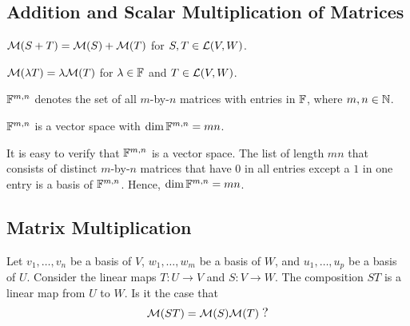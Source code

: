 \subsection{Addition and Scalar Multiplication of Matrices}

\setcounter{thm}{34}
\begin{thm}
  \label{thm: matrix of the sum of linear maps}
  $\mathcal{M}(S+T) = \mathcal{M}(S) + \mathcal{M}(T)$ for $S, T \in \mathcal{L} (V,W)$.
\end{thm}

\setcounter{thm}{37}
\begin{thm}
  \label{thm: matrix of a scalar times a linear map}
  $\mathcal{M}(\lambda T) = \lambda \mathcal{M}(T)$ for $\lambda \in \mathbb{F}$ and $T \in \mathcal{L} (V,W)$.
\end{thm}

\begin{mydef} 
  $\mathbb{F}^{m,n}$ denotes the set of all $m$-by-$n$ matrices with entries in $\mathbb{F}$, where $m,n \in \mathbb{N}$.
\end{mydef}

\begin{thm} 
  \label{thm: the dimension of the vector space of all m by n matrices is mn}
  $\mathbb{F}^{m,n}$ is a vector space with $\dim \mathbb{F}^{m,n}=mn$.
\end{thm}
\begin{prf}
  It is easy to verify that $\mathbb{F}^{m,n}$ is a vector space. The list of length $mn$ that consists of distinct $m$-by-$n$ matrices that have $0$ in all entries except a $1$ in one entry is a basis of $\mathbb{F}^{m,n}$. Hence,
  $\dim \mathbb{F}^{m,n}=mn$.
\end{prf}


\subsection{Matrix Multiplication}

Let $v_1, \ldots, v_n$ be a basis of $V$, $w_1, \ldots, w_m$ be a basis of $W$, and $u_1, \ldots, u_p$ be a basis of $U$.
Consider the linear maps $T: U \to V$ and $S: V \to W$. The composition $ST$ is a linear map from $U$ to $W$. Is it the case that
\begin{equation}
  \mmatrix(ST) = \mmatrix(S)  \mmatrix(T) \; {\mathlarger ?}
\end{equation}


